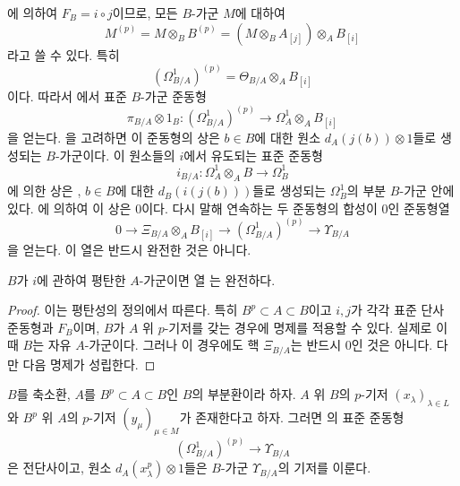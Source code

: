 \begin{env}[21.3.3]
\label{0.21.3.3-ko}
에 의하여 $F_B=i\circ j$이므로, 모든
$B$-가군 $M$에 대하여 
\begin{equation}
\tag{21.3.3.1}\label{0.21.3.3.1-ko}
M^{(p)}=M\otimes_B B^{(p)}
=(M\otimes_B A_{[j]})\otimes_A B_{[i]}
\end{equation}
라고 쓸 수 있다. 특히
\begin{equation}
\tag{21.3.3.2}\label{0.21.3.3.2-ko}
(\Omega^1_{B/A})^{(p)}=\Theta_{B/A}\otimes_A B_{[i]}
\end{equation}
이다. 따라서 에서 표준 $B$-가군 준동형
\begin{equation}
\tag{21.3.3.3}\label{0.21.3.3.3-ko}
\pi_{B/A}\otimes1_B:(\Omega^1_{B/A})^{(p)}
\longrightarrow\Omega^1_A\otimes_A B_{[i]}
\end{equation}
을 얻는다. 을 고려하면 이 준동형의 상은
$b\in B$에 대한 원소 $d_A(j(b))\otimes1$들로 생성되는
$B$-가군이다. 이 원소들의 $i$에서 유도되는 표준 준동형
\[
  i_{B/A}:\Omega^1_A\otimes_A B\longrightarrow\Omega^1_B
\]
에 의한 상은 , $b\in B$에 대한
$d_B(i(j(b)))$들로 생성되는 $\Omega^1_B$의 부분 $B$-가군 안에 있다.
에 의하여 이 상은 $0$이다. 다시 말해 연속하는
두 준동형의 합성이 $0$인 준동형열
\begin{equation}
\tag{21.3.3.4}\label{0.21.3.3.4-ko}
0\longrightarrow\Xi_{B/A}\otimes_A B_{[i]}
\longrightarrow(\Omega^1_{B/A})^{(p)}
\longrightarrow\Upsilon_{B/A}
\end{equation}
을 얻는다. 이 열은 반드시 완전한 것은 아니다.
\end{env}

\begin{proposition}[21.3.4]
\label{0.21.3.4-ko}
$B$가 $i$에 관하여 평탄한 $A$-가군이면 열
는 완전하다.
\end{proposition}

\begin{proof}
이는 평탄성의 정의에서 따른다. 특히 $B^p\subset A\subset B$이고
$i,j$가 각각 표준 단사 준동형과 $F_B$이며, $B$가 $A$ 위
$p$-기저를 갖는 경우에 명제를 적용할 수 있다. 실제로 이때 $B$는
자유 $A$-가군이다. 그러나 이 경우에도 핵 $\Xi_{B/A}$는 반드시
$0$인 것은 아니다. 다만 다음 명제가 성립한다.
\end{proof}

\begin{proposition}[21.3.5]
\label{0.21.3.5-ko}
$B$를 축소환, $A$를 $B^p\subset A\subset B$인 $B$의 부분환이라 하자.
$A$ 위 $B$의 $p$-기저 $(x_\lambda)_{\lambda\in L}$와 $B^p$ 위
$A$의 $p$-기저 $(y_\mu)_{\mu\in M}$가 존재한다고 하자. 그러면
의 표준 준동형
\begin{equation}
\tag{21.3.5.1}\label{0.21.3.5.1-ko}
(\Omega^1_{B/A})^{(p)}\longrightarrow\Upsilon_{B/A}
\end{equation}
은 전단사이고, 원소 $d_A(x_\lambda^p)\otimes1$들은 $B$-가군
$\Upsilon_{B/A}$의 기저를 이룬다.
\end{proposition}

